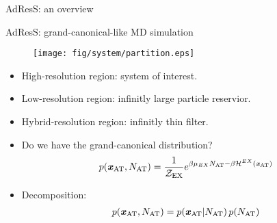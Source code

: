 \documentclass{beamer}
\newcommand{\bluec}[1]{{\color{blue} #1}}
\newcommand{\vect}[1]{\textbf{\textit{#1}}}
\newcommand{\AT}{{\textrm{{AT}}}}
\newcommand{\EX}{{\textrm{EX}}}
\newcommand{\CG}{{\textrm{CG}}}
\newcommand{\thf}{{\textrm{th}}}
\newcommand{\rdf}{{\textrm{rdf}}}
\begin{document}
\begin{frame}{AdResS: an overview}
\end{frame}


\begin{frame}{AdResS: grand-canonical-like MD simulation}
  \begin{figure}
    \centering 
    \texttt{[image: fig/system/partition.eps]}
  \end{figure}
  \begin{itemize}
  \item<1-> High-resolution region: system of interest.
  \item<2-> Low-resolution region: infinitly large particle reservior.
  \item<3-> Hybrid-resolution region: infinitly thin filter.
  \item<4-> Do we have the grand-canonical distribution?
    \bluec{
      \begin{align*}
        p(\vect x_\AT, N_\AT) = \frac{1}{\mathcal Z_\EX}
        e^{\beta\mu_{EX} N_\AT - \beta \mathcal H^{EX}(\vect x_\AT)} 
      \end{align*}}
  \item <5-> Decomposition:
    \bluec{
    \begin{align*}
      p(\vect x_\AT, N_\AT) = p(\vect x_\AT | N_\AT) \,{p (N_\AT)}
    \end{align*}}
  \end{itemize}
\end{frame}
\end{document}
